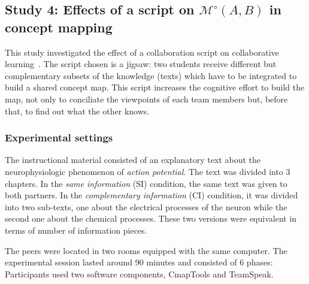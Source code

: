 \documentclass[natbib]{svjour3}
\newcommand{\gModel}[2]{{$\mathcal{M}^{\circ}(#1, #2)$}}
\begin{document}




\subsection{Study 4:  Effects of a script on \gModel{A}{B}  in concept mapping}

This study investigated the effect of a collaboration script on collaborative
learning~\citep{molinari2008effects}. The script chosen is a {\sc jigsaw}: two students
receive different but complementary subsets of the knowledge (texts) which have
to be integrated to build a shared concept map.  This script increases the
cognitive effort to build the map, not only to conciliate the viewpoints of
each team members but, before that, to find out what the other knows. 

\subsubsection*{Experimental settings}

The instructional material consisted of an explanatory text about the
neurophysiologic phenomenon of \emph{action potential}. The text was divided
into 3 chapters.  In the \emph{same information} (SI) condition, the same text
was given to both partners. In the \emph{complementary information} (CI)
condition, it was divided into two sub-texts, one about the electrical processes
of the neuron while the second one about the chemical processes. These two
versions were equivalent in terms of number of information pieces. 

The peers were located in two rooms equipped with the same
computer.  The experimental session lasted around 90 minutes and consisted of 6
phases: Participants used two software components, {\sc CmapTools} and {\sc
TeamSpeak}.
\end{document}

